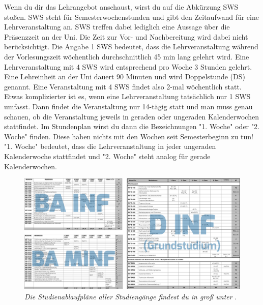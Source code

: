 Wenn du dir das Lehrangebot anschaust, wirst du auf die Abkürzung SWS stoßen. SWS steht für Semesterwochenstunden und gibt den Zeitaufwand für eine Lehrveranstaltung an.
SWS treffen dabei lediglich eine Aussage über die Präsenzzeit an der Uni. Die Zeit zur Vor- und Nachbereitung wird dabei nicht berücksichtigt.
Die Angabe 1 SWS bedeutet, dass die Lehrveranstaltung während der Vorlesungszeit wöchentlich durchschnittlich 45 min lang gelehrt wird. Eine Lehrveranstaltung mit 4 SWS wird entsprechend
pro Woche 3 Stunden gelehrt. Eine Lehreinheit an der Uni dauert 90 Minuten und wird Doppelstunde (DS) genannt. Eine Veranstaltung mit 4 SWS findet also 2-mal wöchentlich statt.
Etwas komplizierter ist es, wenn eine Lehrveranstaltung tatsächlich nur 1 SWS umfasst. Dann findet die Veranstaltung nur 14-tägig statt und man muss genau schauen, ob die Veranstaltung jeweils in
geraden oder ungeraden Kalenderwochen stattfindet. Im Stundenplan wirst du dann die Bezeichnungen "1. Woche" oder "2. Woche" finden. Diese haben nichts mit den Wochen seit Semesterbeginn zu tun!
"1. Woche" bedeutet, dass die Lehrveranstaltung in jeder ungeraden Kalenderwoche stattfindet und "2. Woche" steht analog für gerade Kalenderwochen.

\begin{figure}
	\includegraphics[width=\textwidth]{img/alle_studienablaufplaene.png}
	\caption*{\small \textit{Die Studienablaufpläne aller Studiengänge findest du in groß unter} .}
\end{figure}


